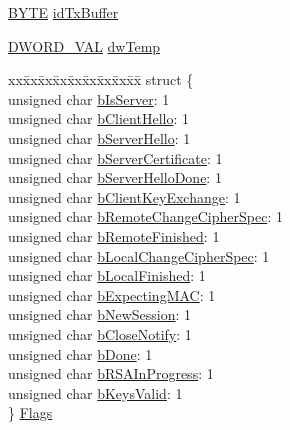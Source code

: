 \begin{DoxyCompactItemize}
\item 
\hyperlink{_generic_type_defs_8h_a4ae1dab0fb4b072a66584546209e7d58}{B\+Y\+T\+E} \hyperlink{struct_s_s_l___s_t_u_b_a2310bbf1b4847c2b8fffec1784af34a0}{id\+Tx\+Buffer}
\item 
\hyperlink{union_d_w_o_r_d___v_a_l}{D\+W\+O\+R\+D\+\_\+\+V\+A\+L} \hyperlink{struct_s_s_l___s_t_u_b_ac634f8e7d951b2462bb247b539cba733}{dw\+Temp}
\item 
\begin{tabbing}
xx\=xx\=xx\=xx\=xx\=xx\=xx\=xx\=xx\=\kill
struct \{\\
\>unsigned char \hyperlink{struct_s_s_l___s_t_u_b_a9696f928e743c579f13f8e33b94e28bb}{bIsServer}: 1\\
\>unsigned char \hyperlink{struct_s_s_l___s_t_u_b_a2e5ed7e5fb7dd6b9044deafa95d71968}{bClientHello}: 1\\
\>unsigned char \hyperlink{struct_s_s_l___s_t_u_b_a6a5cc15fe67f4929e90933e741db9ede}{bServerHello}: 1\\
\>unsigned char \hyperlink{struct_s_s_l___s_t_u_b_a181be6449c8a5b1b6e8b01c5b10d7fa0}{bServerCertificate}: 1\\
\>unsigned char \hyperlink{struct_s_s_l___s_t_u_b_a1d4226fa35675b5087650af562bf14cc}{bServerHelloDone}: 1\\
\>unsigned char \hyperlink{struct_s_s_l___s_t_u_b_abc654a2926d7dd7147a7925377c0cf71}{bClientKeyExchange}: 1\\
\>unsigned char \hyperlink{struct_s_s_l___s_t_u_b_a0e23041b2830c0bd3fa21ec65e6d4f48}{bRemoteChangeCipherSpec}: 1\\
\>unsigned char \hyperlink{struct_s_s_l___s_t_u_b_a3a2fac19e665109b85f3df6d815c5075}{bRemoteFinished}: 1\\
\>unsigned char \hyperlink{struct_s_s_l___s_t_u_b_a012716356fcfa9a31c8f53696b8f0537}{bLocalChangeCipherSpec}: 1\\
\>unsigned char \hyperlink{struct_s_s_l___s_t_u_b_a055539520ae64ed8feed987565218109}{bLocalFinished}: 1\\
\>unsigned char \hyperlink{struct_s_s_l___s_t_u_b_a6406108a08d7540528d9e99e9e04cc5d}{bExpectingMAC}: 1\\
\>unsigned char \hyperlink{struct_s_s_l___s_t_u_b_a5f6cafb73fd774b7debcea58930a81a8}{bNewSession}: 1\\
\>unsigned char \hyperlink{struct_s_s_l___s_t_u_b_a06ead8c4602dac84097eb3412a65aa17}{bCloseNotify}: 1\\
\>unsigned char \hyperlink{struct_s_s_l___s_t_u_b_a00981d210b98090bf658767a2a0ed4e8}{bDone}: 1\\
\>unsigned char \hyperlink{struct_s_s_l___s_t_u_b_ab3135eb957173afd37112849b2b013c0}{bRSAInProgress}: 1\\
\>unsigned char \hyperlink{struct_s_s_l___s_t_u_b_aef6c0bc7a70f91a780dbd3517493d09c}{bKeysValid}: 1\\
\} \hyperlink{struct_s_s_l___s_t_u_b_a66565426ffc0f854f39292ab52754c6e}{Flags}\\


\end{tabbing}
\end{DoxyCompactItemize}

